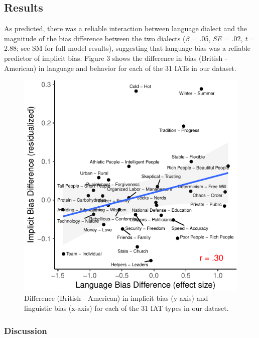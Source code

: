 \documentclass[man,floatsintext]{apa6}
\begin{document}
\hypertarget{results-3}{%
\subsection{Results}\label{results-3}}

As predicted, there was a reliable interaction between language dialect and the magnitude of the bias difference between the two dialects (\(\beta\) = .05, \emph{SE} = .02, \emph{t} = 2.88; see SM for full model results), suggesting that language bias was a reliable predictor of implicit bias. Figure 3 shows the difference in bias (British - American) in language and behavior for each of the 31 IATs in our dataset.

\begin{figure}
\centering
\includegraphics{iat_lang_files/figure-latex/1cplot-1.pdf}
\caption{\label{fig:1cplot}Difference (British - American) in implicit bias (y-axis) and linguistic bias (x-axis) for each of the 31 IAT types in our dataset.}
\end{figure}

\hypertarget{discussion}{%
\subsubsection{Discussion}\label{discussion}}
\end{document}
